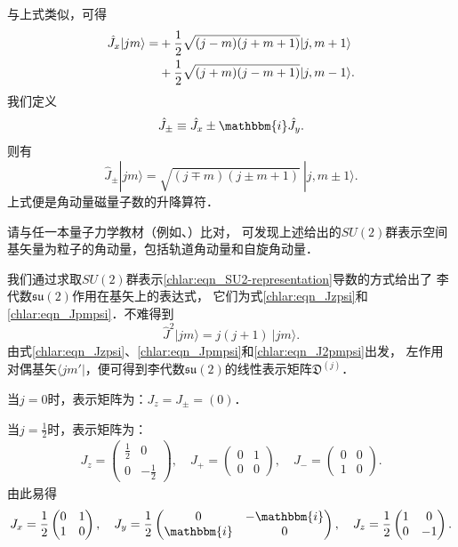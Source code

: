 与上式类似，可得
\begin{align}
    \hat{J}_x|jm\rangle =&+ \frac{1}{2}\sqrt{(j-m)(j+m+1)}|j,m+1\rangle \notag \\
    &+\frac{1}{2}\sqrt{ (j+m) (j-m+1)} |j,m-1\rangle. \label{chlar:eqn_Jx}
\end{align}
我们定义
\begin{equation}
    \hat{J}_{\pm} \equiv \hat{J}_x \pm \mathbbm{i}\hat{J}_y.
\end{equation}
则有
\begin{equation}\label{chlar:eqn_Jpmpsi}
    \hat{J}_{\pm} |jm\rangle = \sqrt{(j\mp m)(j\pm m+1)} \  |j,m\pm 1\rangle .
\end{equation}
上式便是角动量磁量子数的升降算符．

请与任一本量子力学教材（例如\parencite[\S 22-4]{ka2001}、\parencite[\S 11.5]{taorb-2011-gt}）比对，
可发现上述给出的$SU(2)$群表示空间基矢量为粒子的角动量，包括轨道角动量和自旋角动量．


我们通过求取$SU(2)$群表示\eqref{chlar:eqn_SU2-representation}导数的方式给出了
李代数$\mathfrak{su}(2)$作用在基矢上的表达式，
它们为式\eqref{chlar:eqn_Jzpsi}和\eqref{chlar:eqn_Jpmpsi}．不难得到
\begin{equation}\label{chlar:eqn_J2pmpsi}
    \hat{J}^2 |jm\rangle = j(j+1) \  |jm\rangle .
\end{equation}
由式\eqref{chlar:eqn_Jzpsi}、\eqref{chlar:eqn_Jpmpsi}和\eqref{chlar:eqn_J2pmpsi}出发，
左作用对偶基矢$\langle jm'|$，便可得到李代数$\mathfrak{su}(2)$的线性表示矩阵$\mathfrak{D}^{(j)}$．


\noindent  当$j=0$时，表示矩阵为：$J_z=J_{\pm}=(0)$．

\noindent  当$j=\frac{1}{2}$时，表示矩阵为：
\begin{align}
    J_z=\begin{pmatrix}
        \frac{1}{2} & 0 \\ 0 & -\frac{1}{2}
    \end{pmatrix},\quad
    J_{+}=\begin{pmatrix}
        0 & 1 \\ 0 & 0
    \end{pmatrix},\quad
    J_{-}=\begin{pmatrix}
        0 & 0 \\ 1 & 0
    \end{pmatrix}.  \label{chlar:eqn_su2-am}
\end{align}
由此易得
\begin{align}
    J_{x}=\frac{1}{2}\begin{pmatrix}
        0 & 1 \\ 1 & 0
    \end{pmatrix},\quad
    J_{y}=\frac{1}{2}\begin{pmatrix}
        0 & -\mathbbm{i} \\ \mathbbm{i} & 0
    \end{pmatrix},\quad
    J_z=\frac{1}{2} \begin{pmatrix}
        1 & 0 \\ 0 & -1
    \end{pmatrix}.
\end{align}

